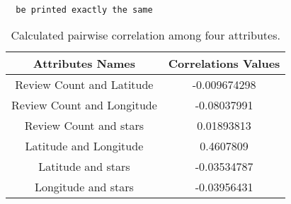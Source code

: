 \documentclass[10pt,a4paper]{article}
\begin{document}


\begin{verbatim}

  be printed exactly the same

\end{verbatim}


\begin{table}[H]
\begin{tabular}{c|c}
\centering
Attributes Names            &Correlations Values\\
\hline

Review Count and Latitude   &-0.009674298\\
Review Count and Longitude  &-0.08037991\\
 Review Count and stars	   &0.01893813\\
 Latitude and Longitude	   &0.4607809\\
 Latitude and stars	       &-0.03534787\\
 Longitude and stars	       &-0.03956431\\

\end{tabular}
\caption{Calculated pairwise correlation among four attributes.}
\end{table}
\end{document}
